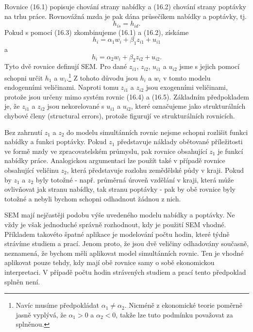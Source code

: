 Rovnice (16.1) popisuje chování strany nabídky a (16.2) chování strany poptávky na trhu práce. Rovnovážná mzda je pak dána průsečíkem nabídky a poptávky, tj.
\begin{equation}
h_{is} = h_{id}.
\end{equation}
Pokud s pomocí (16.3) zkombinujeme (16.1) a (16.2), získáme
\begin{equation}
h_i = \alpha_1 w_i + \beta_1 z_{i1} + u_{i1}
\end{equation}
a
\begin{equation}
h_i = \alpha_2 w_i + \beta_2 z_{i2} + u_{i2}.
\end{equation}
Tyto dvě rovnice definují SEM. Pro dané $z_{i1}$, $z_{i2}$, $u_{i1}$ a $u_{i2}$ jsme s jejich pomocí schopni určit $h_1$ a $w_i$.\footnote{Navíc musíme předpokládat $\alpha_1 \ne \alpha_2$. Nicméně z ekonomické teorie poměrně jasně vyplývá, že $\alpha_1 > 0$ a $\alpha_2 < 0$, takže lze tuto podmínku považovat za splněnou.} Z tohoto důvodu jsou $h_i$ a $w_i$ v tomto modelu endogenními veličinami. Naproti tomu $z_{i1}$ a $z_{i2}$ jsou exogenními veličinami, protože jsou určeny mimo systém rovnic (16.4) a (16.5). Základním předpokladem je, že $z_{i1}$ a $z_{i2}$ jsou nekorelované s $u_{i1}$ a $u_{i2}$, které označujeme jako strukturálních chybové členy (structural errors), protože figurují ve strukturálních rovnicích.

Bez zahrnutí $z_1$ a $z_2$ do modelu simultánních rovnic nejsme schopni rozlišit funkci nabídky a funkci poptávky. Pokud $z_1$ představuje náklady obětované příležitosti ve formě mzdy ve zpracovatelském průmyslu, pak rovnice obsahující $z_1$ je funkcí nabídky práce. Analogickou argumentaci lze použít také v případě rovnice obsahující veličinu $z_2$, která představuje rozlohu zemědělské půdy v kraji. Pokud by $z_1$ a $z_2$ byly totožné - např. průměrná úroveň vzdělání v kraji, která může ovlivňovat jak stranu nabídky, tak stranu poptávky - pak by obě rovnice byly totožné a nebyli bychom schopni odhadnout žádnou z nich.

SEM mají nejčastěji podobu výše uvedeného modelu nabídky a poptávky. Ne vždy je však jednoduché správně rozhodnout, kdy je použití SEM vhodné. Příkladem takovéto špatné aplikace je modelování počtu hodin, které týdně strávíme studiem a prací. Jenom proto, že jsou dvě veličiny odhadovány současně, neznamená, že bychom měli aplikovat model simultánních rovnic. Ten je vhodné aplikovat pouze tehdy, kdy mají obě rovnice samy o sobě ekonomickou interpretaci. V případě počtu hodin strávených studiem a prací tento předpoklad splněn není.

